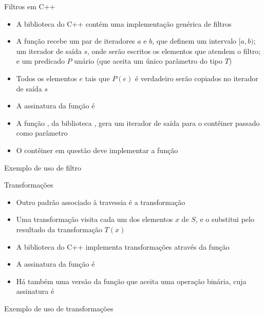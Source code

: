 \begin{frame}[fragile]{Filtros em C++}

    \begin{itemize}
        \item A biblioteca  do C++ contém uma implementação genérica de
            filtros

        \item A função  recebe um par de iteradores $a$ e $b$, que 
            definem um intervalo $[a, b)$; um iterador de saída $s$, onde serão escritos
            os elementos que atendem o filtro; e um predicado $P$ unário (que aceita um único
            parâmetro do tipo $T$)

        \item Todos os elementos $e$ tais que $P(e)$ é verdadeiro serão copiados no iterador de
            saída $s$

        \item A assinatura da função  é 

        \item A função , da biblioteca , gera
            um iterador de saída para o contêiner passado como parâmetro

        \item O contêiner em questão deve implementar a função 

    \end{itemize}

\end{frame}

\begin{frame}[fragile]{Exemplo de uso de filtro}
\end{frame}

\begin{frame}[fragile]{Transformações}

    \begin{itemize}
        \item Outro padrão associado à travessia é a transformação

        \item Uma transformação visita cada um dos elementos $x$ de $S$, e o substitui pelo 
            resultado da transformação $T(x)$

        \item A biblioteca  do C++ implementa transformações através da
            função 

        \item A assinatura da função  é

        \item Há também uma versão da função  que aceita uma operação
            binária, cuja assinatura é

    \end{itemize}

\end{frame}

\begin{frame}[fragile]{Exemplo de uso de transformações}
\end{frame}
